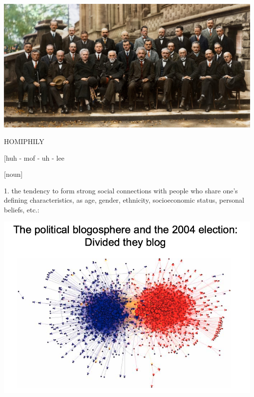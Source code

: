 \documentclass{beamer}
\begin{document}
\begin{frame}
    \begin{center}
        \includegraphics[width=\textwidth]{static/stem.jpg}
    \end{center}
\end{frame}

\begin{frame}
    \begin{center}
    \begin{minipage}{.5\textwidth}
        \LARGE{HOMIPHILY}
    \end{minipage}
    \begin{minipage}{.3\textwidth}
        \normalsize{[huh - mof - uh - lee}
    \end{minipage}
    \vspace{.5cm}

    \hspace{-8cm} \normalsize{[noun]}\\
    \end{center}
    \hspace{.8cm} \normalsize{1. the tendency to form strong social connections
    with people who share one’s defining characteristics, as age, gender, ethnicity, 
    socioeconomic status, personal beliefs, etc.:}
\end{frame}

\begin{frame}
    \begin{center}
        \includegraphics[width=\textwidth]{static/homophily.png}
    \end{center}
\end{frame}
\end{document}
